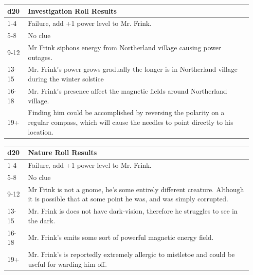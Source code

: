 \documentclass{article}
\begin{document}
\begin{multicols*}{2}
	\begin{table}[H]
		\begin{tabular}{|m{2.5em}|m{20em}|}
			\hline
			\textbf{d20} & \textbf{Investigation Roll Results} \\
			\hline
			\hline
			1-4 & Failure, add +1 power level to Mr. Frink. \\
			\hline
			5-8 & No clue \\
			\hline
			9-12 & Mr Frink siphons energy from Northerland village causing power outages. \\
			\hline
			13-15 & Mr. Frink's power grows gradually the longer is in Northerland village during the winter solstice \\ 
			\hline
			16-18 &  Mr. Frink's presence affect the magnetic fields around Northerland village. \\
			\hline
			19+ & Finding him could be accomplished by reversing the polarity on a regular compass, which will cause the needles to point directly to his location. \\
			\hline
		\end{tabular}
	\end{table}

	\begin{table}[H]
		\begin{tabular}{|m{2.5em}|m{20em}|}
			\hline
			\textbf{d20} & \textbf{Nature Roll Results} \\
			\hline
			\hline
			1-4 & Failure, add +1 power level to Mr. Frink. \\
			\hline
			5-8 & No clue  \\
			\hline
			9-12 & Mr Frink is not a gnome, he's some entirely different creature. Although it is possible that at some point he was, and was simply corrupted. \\
			\hline
			13-15 & Mr. Frink is does not have dark-vision, therefore he struggles to see in the dark. \\ 
			\hline
			16-18 &  Mr. Frink's emits some sort of powerful magnetic energy field.  \\
			\hline
			19+ & Mr. Frink's is reportedly extremely allergic to mistletoe and could be useful for warding him off. \\
			\hline
		\end{tabular}
	\end{table}


\end{multicols*}
\end{document}
